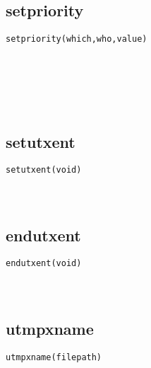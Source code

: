 \documentclass[10pt,a4paper]{article}
\begin{document}
\subsection{setpriority}
\begin{spacing}{2.0}
\lstset{language=C,numbers=none}
\begin{lstlisting}
setpriority(which,who,value)
\end{lstlisting}
{\large\color[rgb]{0.2,0.4,0.6}{which:}} \\
{\large\color[rgb]{0.2,0.4,0.6}{who:}} \\
{\large\color[rgb]{0.2,0.4,0.6}{value:}}
\paragraph{ \ \ }
\end{spacing}

\subsection{setutxent}
\begin{spacing}{2.0}
\lstset{language=C,numbers=none}
\begin{lstlisting}
setutxent(void)
\end{lstlisting}
{\large\color[rgb]{0.2,0.4,0.6}{void:}}
\paragraph{ \ \ }
\end{spacing}

\subsection{endutxent}
\begin{spacing}{2.0}
\lstset{language=C,numbers=none}
\begin{lstlisting}
endutxent(void)
\end{lstlisting}
{\large\color[rgb]{0.2,0.4,0.6}{void:}}
\paragraph{ \ \ }
\end{spacing}

\subsection{utmpxname}
\begin{spacing}{2.0}
\lstset{language=C,numbers=none}
\begin{lstlisting}
utmpxname(filepath)
\end{lstlisting}
{\large\color[rgb]{0.2,0.4,0.6}{filepath:}}
\paragraph{ \ \ }
\end{spacing}
\end{document}
